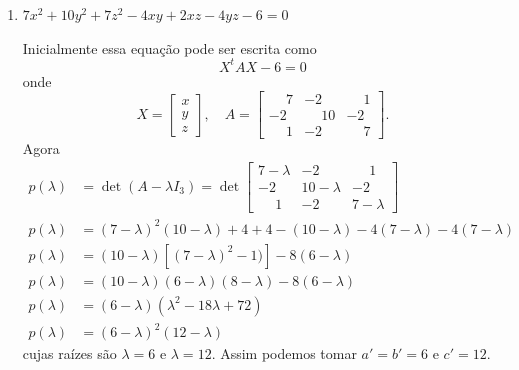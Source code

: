 \begin{exemplos}
\begin{enumerate}
        \item $7x^2 + 10y^2 + 7z^2 - 4xy + 2xz - 4yz - 6 = 0$
              \begin{solucao}
                  Inicialmente essa equação pode ser escrita como
                  \[
                      X^tAX - 6 = 0
                  \]
                  onde
                  \[
                      X = \begin{bmatrix}
                          x \\ y\\ z
                      \end{bmatrix},\quad A = \begin{bmatrix}
                          \phantom{-}7 & -2            & \phantom{-}1 \\
                          -2           & \phantom{-}10 & -2           \\
                          \phantom{-}1 & -2            & \phantom{-}7
                      \end{bmatrix}.
                  \]
                  Agora
                  \begin{align*}
                      p(\lambda) & = \det(A - \lambda I_3) = \det \begin{bmatrix}
                                                                      7 - \lambda  & -2          & \phantom{-}1 \\
                                                                      -2           & 10 -\lambda & -2           \\
                                                                      \phantom{-}1 & -2          & 7 -\lambda
                                                                  \end{bmatrix}                   \\
                      p(\lambda) & = (7 - \lambda)^2(10 - \lambda) + 4 + 4 - (10 - \lambda) - 4(7 - \lambda) - 4(7 - \lambda) \\
                      p(\lambda) & = (10 - \lambda)[(7 - \lambda)^2 - 1)] - 8(6 - \lambda)                                    \\
                      p(\lambda) & = (10 - \lambda)(6 - \lambda)(8 - \lambda) - 8(6 - \lambda)                                \\
                      p(\lambda) & = (6 - \lambda)(\lambda^2 - 18\lambda + 72)                                                \\
                      p(\lambda) & = (6 - \lambda)^2(12 - \lambda)
                  \end{align*}
                  cujas raízes são $\lambda = 6$ e $\lambda = 12$. Assim podemos tomar $a' = b' = 6$ e $c' = 12$.


\end{solucao}
\end{enumerate}
\end{exemplos}
